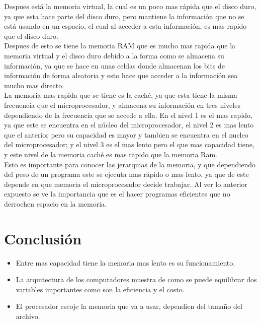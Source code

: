 \documentclass{article}
\begin{document}
Despues está la memoria virtual, la cual es un poco mas rápida que el disco duro, ya que esta hace parte del disco duro, pero mantiene la información que no se está usando en un espacio, el cual al acceder a esta información, es mas rapido que el disco duro. \\

Despues de esto se tiene la memoria RAM  que es mucho mas rapida que la memoria virtual y el disco duro debido a la forma como se almacena su información, ya que se hace en unas celdas donde almacenan los bits de información de forma aleatoria y esto hace que acceder a la información sea mucho mas directo.\\

La memoria mas rapida que se tiene es la caché, ya que esta tiene la misma frecuencia que el microprocesador, y almacena su información en tres niveles dependiendo de la frecuencia que se accede a ella. En el nivel 1 es el mas rapido, ya que este se encuentra en el núcleo del microprocesador, el nivel 2 es mas lento que el anterior pero su capacidad es mayor y tambien se encuentra en el nucleo del microprocesador; y el nivel 3 es el mas lento pero el que mas capacidad tiene, y este nivel de la memoria caché es mas rapido que la memoria Ram.\\

Esto es importante para conocer las jerarquias de la memoria, y que dependiendo del peso de un programa este se ejecuta mas rápido o mas lento, ya que de este depende en que memoria el microprocesador decide trabajar. Al ver lo anterior expuesto se ve la importancia que es el hacer programas eficientes que no derrochen espacio en la memoria.  

\section{Conclusión} \label{conclulsion}
\begin{itemize}
    \item  Entre mas capacidad tiene la memoria mas lento es su funcionamiento.
    \item La arquitectura de los computadores muestra de como se puede equilibrar dos variables importantes como son la eficiencia y el costo.
    \item El procesador escoje la memoria que va a usar, dependien del tamaño del archivo.
\end{itemize}



\end{document}
